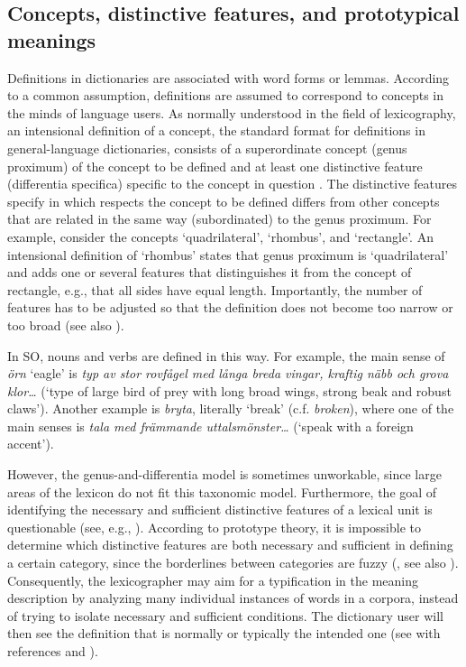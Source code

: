 \documentclass[output=paper]{langscibook}
\begin{document}
\subsection{Concepts, distinctive features, and prototypical meanings}
 Definitions in dictionaries are associated with word forms or lemmas. According to a common assumption, definitions are assumed to correspond to concepts in the minds of language users. As normally understood in the field of lexicography, an intensional definition of a concept, the standard format for definitions in general-language dictionaries, consists of a superordinate concept (genus proximum) of the concept to be defined and at least one distinctive feature (differentia specifica) specific to the concept in question \citep[218--221]{svensen2009}. The distinctive features specify in which respects the concept to be defined differs from other concepts that are related in the same way (subordinated) to the genus proximum. For example, consider the concepts `quadrilateral', `rhombus', and `rectangle'. An intensional definition of `rhombus' states that genus proximum is `quadrilateral' and adds one or several features that distinguishes it from the concept of rectangle, e.g., that all sides have equal length. Importantly, the number of features has to be adjusted so that the definition does not become too narrow or too broad (see also \citealt[414--417]{atkins2008}).

In SO, nouns and verbs are defined in this way. For example, the main sense of \emph{örn} `eagle' is \textit{typ av stor rovfågel med långa breda vingar, kraftig näbb och grova klor\ldots} (`type of large bird of prey with long broad wings, strong beak and robust claws'). Another example is \emph{bryta}, literally `break' (c.f. \emph{broken}), where one of the main senses is \textit{tala med främmande uttalsmönster\ldots} (`speak with a foreign accent').

However, the genus-and-differentia model is sometimes unworkable, since large areas of the lexicon do not fit this taxonomic model. Furthermore, the goal of identifying the necessary and sufficient distinctive features of a lexical unit is questionable (see, e.g., \citealt[416]{atkins2008}). According to prototype theory, it is impossible to determine which distinctive features are both necessary and sufficient in defining a certain category, since the borderlines between categories are fuzzy (\citealt[224]{svensen2009}, see also \citealt{rosch1975}). Consequently, the lexicographer may aim for a typification in the meaning description by analyzing many individual instances of words in a corpora, instead of trying to isolate necessary and sufficient conditions. The dictionary user will then see the definition that is normally or typically the intended one (see \citealt[418]{atkins2008} with references and \citealt[222--223]{svensen2009}). 
\end{document}
